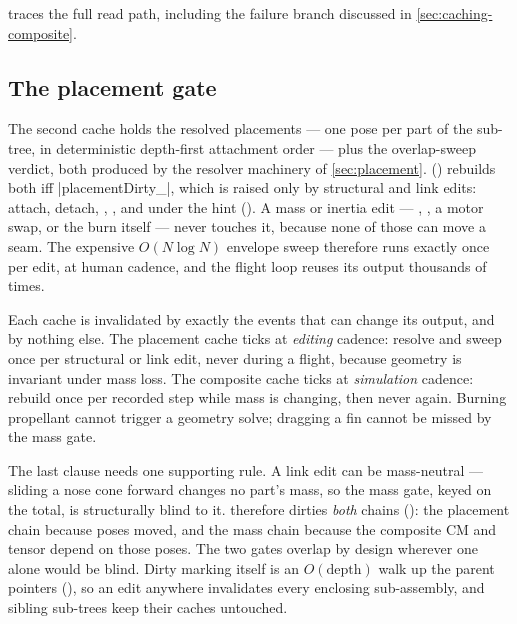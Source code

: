  traces the full read path, including the failure branch discussed in
\cref{sec:caching-composite}.


\subsection{The placement gate}\label{sec:caching-placementgate}

The second cache holds the resolved placements --- one  pose per part of the
sub-tree, in deterministic depth-first attachment order --- plus the overlap-sweep verdict, both
produced by the resolver machinery of \cref{sec:placement}. 
() rebuilds both iff \cppinline|placementDirty_|, which is
raised only by structural and link edits: attach, detach, , , and
 under the  hint (). A mass or
inertia edit --- , , a motor swap, or the burn itself ---
never touches it, because none of those can move a seam. The expensive $O(N \log N)$ envelope
sweep therefore runs exactly once per edit, at human cadence, and the flight loop reuses its
output thousands of times.

\begin{designrule}
Each cache is invalidated by exactly the events that can change its output, and by nothing else.
The placement cache ticks at \emph{editing} cadence: resolve and sweep once per structural or link
edit, never during a flight, because geometry is invariant under mass loss. The composite cache
ticks at \emph{simulation} cadence: rebuild once per recorded step while mass is changing, then
never again. Burning propellant cannot trigger a geometry solve; dragging a fin cannot be missed
by the mass gate.
\end{designrule}

The last clause needs one supporting rule. A link edit can be mass-neutral --- sliding a nose cone
forward changes no part's mass, so the mass gate, keyed on the total, is structurally blind to it.
 therefore dirties \emph{both} chains (): the
placement chain because poses moved, and the mass chain because the composite CM and tensor depend
on those poses. The two gates overlap by design wherever one alone would be blind. Dirty marking
itself is an $O(\text{depth})$ walk up the parent pointers (),
so an edit anywhere invalidates every enclosing sub-assembly, and sibling sub-trees keep their
caches untouched.

